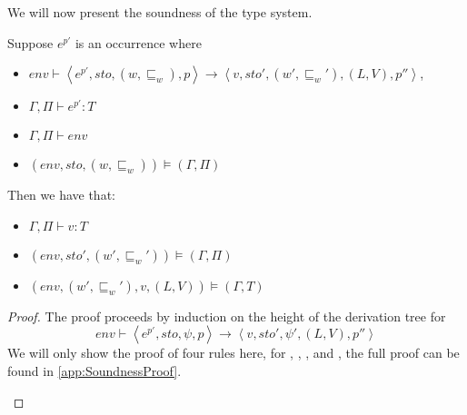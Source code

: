 \documentclass[../../master.tex]{subfiles}
\begin{document}
We will now present the soundness of the type system.

\begin{theorem}
	Suppose $e^{p'}$ is an occurrence where
	\begin{itemize}
		\item $env\vdash\left\langle e^{p'},sto,(w,\sqsubseteq_w),p\right\rangle\rightarrow\left\langle v,sto',(w',\sqsubseteq_w'),(L,V),p''\right\rangle$,
		\item $\Gamma,\Pi\vdash e^{p'} : T$
		\item $\Gamma,\Pi\vdash env$
		\item $(env,sto,(w,\sqsubseteq_w))\models(\Gamma,\Pi)$
	\end{itemize}
	Then we have that:
	\begin{itemize}
		\item $\Gamma,\Pi\vdash v:T$
		\item $(env,sto',(w',\sqsubseteq_w'))\models(\Gamma,\Pi)$
		\item $(env,(w',\sqsubseteq_w'),v,(L,V))\models(\Gamma,T)$
	\end{itemize}
\end{theorem}
\begin{proof}
	The proof proceeds by induction on the height of the derivation tree for 
	$$env\vdash\left\langle e^{p'},sto,\psi,p\right\rangle\rightarrow\left\langle v,sto',\psi',(L,V),p''\right\rangle$$
	We will only show the proof of four rules here, for , , , and , the full proof can be found in \cref{app:SoundnessProof}.

	\begin{description}
		
		
		
		
	\end{description}
\end{proof}


%
\end{document}
